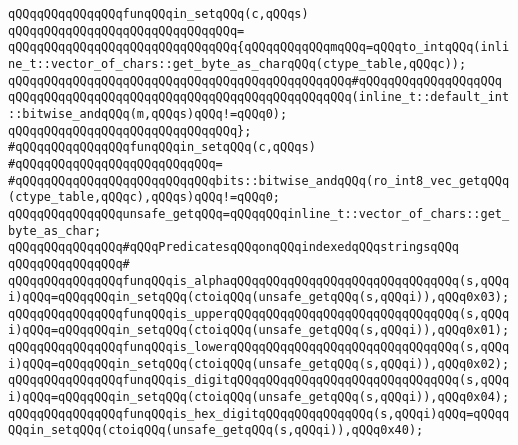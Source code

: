 \newline
\verb|qQQqqQQqqQQqqQQqfunqQQqin_setqQQq(c,qQQqs)|\newline
\verb|qQQqqQQqqQQqqQQqqQQqqQQqqQQqqQQq=|\newline
\verb|qQQqqQQqqQQqqQQqqQQqqQQqqQQqqQQq{qQQqqQQqqQQqmqQQq=qQQqto_intqQQq(inline_t::vector_of_chars::get_byte_as_charqQQq(ctype_table,qQQqc));|\newline
\verb|qQQqqQQqqQQqqQQqqQQqqQQqqQQqqQQqqQQqqQQqqQQqqQQq#qQQqqQQqqQQqqQQqqQQq|\newline
\verb|qQQqqQQqqQQqqQQqqQQqqQQqqQQqqQQqqQQqqQQqqQQqqQQq(inline_t::default_int::bitwise_andqQQq(m,qQQqs)qQQq!=qQQq0);|\newline
\verb|qQQqqQQqqQQqqQQqqQQqqQQqqQQqqQQq};|\newline
\newline
\verb|#qQQqqQQqqQQqqQQqfunqQQqin_setqQQq(c,qQQqs)|\newline
\verb|#qQQqqQQqqQQqqQQqqQQqqQQqqQQq=|\newline
\verb|#qQQqqQQqqQQqqQQqqQQqqQQqqQQqbits::bitwise_andqQQq(ro_int8_vec_getqQQq(ctype_table,qQQqc),qQQqs)qQQq!=qQQq0;|\newline
\newline
\verb|qQQqqQQqqQQqqQQqunsafe_getqQQq=qQQqqQQqinline_t::vector_of_chars::get_byte_as_char;|\newline
\newline
\verb|qQQqqQQqqQQqqQQq#qQQqPredicatesqQQqonqQQqindexedqQQqstringsqQQq|\newline
\verb|qQQqqQQqqQQqqQQq#|\newline
\verb|qQQqqQQqqQQqqQQqfunqQQqis_alphaqQQqqQQqqQQqqQQqqQQqqQQqqQQqqQQq(s,qQQqi)qQQq=qQQqqQQqin_setqQQq(ctoiqQQq(unsafe_getqQQq(s,qQQqi)),qQQq0x03);|\newline
\verb|qQQqqQQqqQQqqQQqfunqQQqis_upperqQQqqQQqqQQqqQQqqQQqqQQqqQQqqQQq(s,qQQqi)qQQq=qQQqqQQqin_setqQQq(ctoiqQQq(unsafe_getqQQq(s,qQQqi)),qQQq0x01);|\newline
\verb|qQQqqQQqqQQqqQQqfunqQQqis_lowerqQQqqQQqqQQqqQQqqQQqqQQqqQQqqQQq(s,qQQqi)qQQq=qQQqqQQqin_setqQQq(ctoiqQQq(unsafe_getqQQq(s,qQQqi)),qQQq0x02);|\newline
\verb|qQQqqQQqqQQqqQQqfunqQQqis_digitqQQqqQQqqQQqqQQqqQQqqQQqqQQqqQQq(s,qQQqi)qQQq=qQQqqQQqin_setqQQq(ctoiqQQq(unsafe_getqQQq(s,qQQqi)),qQQq0x04);|\newline
\verb|qQQqqQQqqQQqqQQqfunqQQqis_hex_digitqQQqqQQqqQQqqQQq(s,qQQqi)qQQq=qQQqqQQqin_setqQQq(ctoiqQQq(unsafe_getqQQq(s,qQQqi)),qQQq0x40);|\newline
